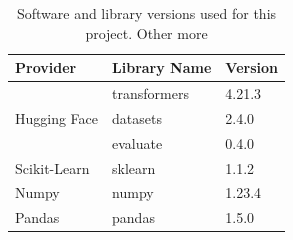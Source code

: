 \begin{table}[ht]
    \captionsetup{font=small}
    \centering
    \begin{tabularx}{\textwidth}{|X|X|X|}
        \hline
        \rowcolor[gray]{0.7}
        \multirow{-3}{*}{} \textbf{Provider} & \textbf{Library Name} & \textbf{Version} \\
        \hline
        \multirow{3}{*}{Hugging Face}        & transformers          & 4.21.3           \\
        \cline{2-3}
                                             & datasets              & 2.4.0            \\
        \cline{2-3}
                                             & evaluate              & 0.4.0            \\
        \hline
        Scikit-Learn                         & sklearn               & 1.1.2            \\
        \hline
        Numpy                                & numpy                 & 1.23.4           \\
        \hline
        Pandas                               & pandas                & 1.5.0            \\
        \hline
    \end{tabularx}
    \caption{Software and library versions used for this project. Other more }
    \label{tab: libs_used}
\end{table}

